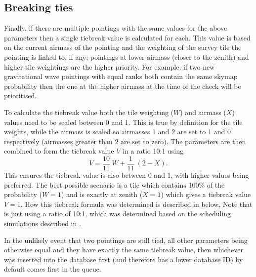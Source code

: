 \begin{colsection}
\begin{colsection}
\end{colsection}

\subsection{Breaking ties}
\label{sec:breaking_ties}
\begin{colsection}

Finally, if there are multiple pointings with the same values for the above parameters then a single tiebreak value is calculated for each. This value is based on the current airmass of the pointing and the weighting of the survey tile the pointing is linked to, if any; pointings at lower airmass (closer to the zenith) and higher tile weightings are the higher priority. For example, if two new gravitational wave pointings with equal ranks both contain the same skymap probability then the one at the higher airmass at the time of the check will be prioritised.

To calculate the tiebreak value both the tile weighting ($W$) and airmass ($X$) values need to be scaled between 0 and 1. This is true by definition for the tile weights, while the airmass is scaled so airmasses 1 and 2 are set to 1 and 0 respectively (airmasses greater than 2 are set to zero). The parameters are then combined to form the tiebreak value $V$ in a ratio 10:1 using
%
\begin{equation}
    V = \frac{10}{11}~W + \frac{1}{11}~(2 - X).
    \label{eq:tiebreak}
\end{equation}
%
This ensures the tiebreak value is also between 0 and 1, with higher values being preferred. The best possible scenario is a tile which contains 100\% of the probability ($W=1$) and is exactly at zenith ($X=1$) which gives a tiebreak value $V=1$. How this tiebreak formula was determined is described in  below. Note that  is just  using a ratio of 10:1, which was determined based on the scheduling simulations described in .

In the unlikely event that two pointings are still tied, all other parameters being otherwise equal and they have exactly the same tiebreak value, then whichever was inserted into the database first (and therefore has a lower database ID) by default comes first in the queue.

\end{colsection}


\end{colsection}

